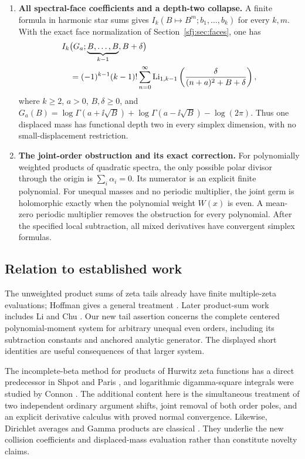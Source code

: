 \begin{enumerate}[label=\textbf{\arabic*.},leftmargin=*]
\item \textbf{All spectral-face coefficients and a depth-two collapse.}
A finite formula in harmonic star sums gives
\(I_k(B\mapsto B^m;b_1,\ldots,b_k)\) for every \(k,m\).
With the exact face normalization of
Section~\ref{sfj:sec:faces}, one has
\[
 \begin{aligned}
 &I_k\bigl(G_a;\underbrace{B,\ldots,B}_{k-1},B+\delta\bigr)\\
 &\quad=(-1)^{k-1}(k-1)!
 \sum_{n=0}^{\infty}
 \operatorname{Li}_{1,k-1}\left(\frac{\delta}{(n+a)^2+B+\delta}\right),
 \end{aligned}
\]
where \(k\ge2\), \(a>0\), \(B,\delta\ge0\), and
\(G_a(B)=\log\Gamma(a+\ii\sqrt B)+
\log\Gamma(a-\ii\sqrt B)-\log(2\pi)\).
Thus one displaced mass has functional depth two in every
simplex dimension, with no small-displacement restriction.

\item \textbf{The joint-order obstruction and its exact correction.}
For polynomially weighted products of quadratic spectra, the only
possible polar divisor through the origin is
\(\sum_i\alpha_i=0\). Its numerator is an explicit finite
polynomial. For unequal masses and no periodic multiplier, the joint germ is
holomorphic exactly when the polynomial weight \(W(x)\) is even.
A mean-zero periodic multiplier removes the obstruction for
every polynomial. After the specified local subtraction, all
mixed derivatives have convergent simplex formulas.
\end{enumerate}

\subsection{Relation to established work}

The unweighted product sums of zeta tails already have finite
multiple-zeta evaluations; Hoffman gives a general treatment
\cite{Hoffman}. Later product-sum work includes Li and Chu
\cite{LiChu}. Our new tail assertion concerns the complete
centered polynomial-moment system for arbitrary unequal even
orders, including its subtraction constants and anchored analytic
generator. The displayed short identities are useful consequences
of that larger system.

The incomplete-beta method for products of Hurwitz zeta functions
has a direct predecessor in Shpot and Paris
\cite{ShpotParis}, and logarithmic digamma-square integrals
were studied by Connon \cite{Connon}. The additional content
here is the simultaneous treatment of two independent ordinary
argument shifts, joint removal of both order poles, and an
explicit derivative calculus with proved normal convergence.
Likewise, Dirichlet averages and Gamma products are classical
\cite{Carlson,DLMF}. They underlie the new
collision coefficients and displaced-mass evaluation rather than
constitute novelty claims.

